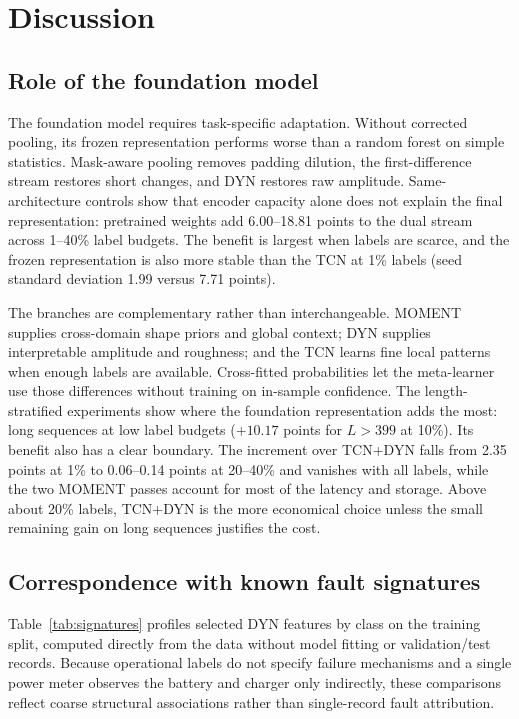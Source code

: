 \documentclass{iopjournal}
\begin{document}
\section{Discussion}\label{sec:discussion}

\subsection{Role of the foundation model}

The foundation model requires task-specific adaptation. Without corrected pooling, its frozen representation performs worse than a random forest on simple statistics. Mask-aware pooling removes padding dilution, the first-difference stream restores short changes, and DYN restores raw amplitude. Same-architecture controls show that encoder capacity alone does not explain the final representation: pretrained weights add 6.00--18.81 points to the dual stream across 1--40\% label budgets. The benefit is largest when labels are scarce, and the frozen representation is also more stable than the TCN at 1\% labels (seed standard deviation 1.99 versus 7.71 points).

The branches are complementary rather than interchangeable. MOMENT supplies cross-domain shape priors and global context; DYN supplies interpretable amplitude and roughness; and the TCN learns fine local patterns when enough labels are available. Cross-fitted probabilities let the meta-learner use those differences without training on in-sample confidence. The length-stratified experiments show where the foundation representation adds the most: long sequences at low label budgets ($+10.17$ points for $L>399$ at 10\%). Its benefit also has a clear boundary. The increment over TCN+DYN falls from 2.35 points at 1\% to 0.06--0.14 points at 20--40\% and vanishes with all labels, while the two MOMENT passes account for most of the latency and storage. Above about 20\% labels, TCN+DYN is the more economical choice unless the small remaining gain on long sequences justifies the cost.

\subsection{Correspondence with known fault signatures}\label{sec:signatures}

Table~\ref{tab:signatures} profiles selected DYN features by class on the training split, computed directly from the data without model fitting or validation/test records. Because operational labels do not specify failure mechanisms and a single power meter observes the battery and charger only indirectly, these comparisons reflect coarse structural associations rather than single-record fault attribution.
\end{document}
